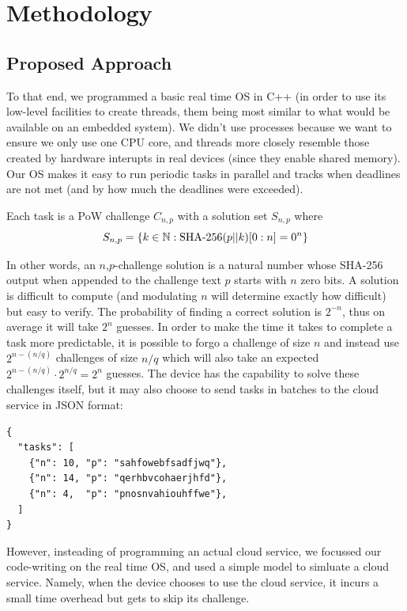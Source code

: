 \documentclass[twoside,twocolumn]{article}
\newcommand{\newp}{\newline\indent}
\begin{document}

\section{Methodology}

\subsection{Proposed Approach}
To that end, we programmed a basic real time OS in C++ (in order to use its low-level facilities to create threads, them being most similar to what would be available on an embedded system).
We didn't use processes because we want to ensure we only use one CPU core, and threads more closely resemble those created by hardware interupts in real devices (since they enable shared memory).
Our OS makes it easy to run periodic tasks in parallel and tracks when deadlines are not met (and by how much the deadlines were exceeded).

Each task is a PoW challenge $C_{n,p}$ with a solution set $S_{n,p}$ where
\[
  S_{n,p} = \{ k \in \mathbb{N} : \textnormal{SHA-256}(p || k)[0:n] = 0^n \}
\]

In other words, an $n$,$p$-challenge solution is a natural number whose SHA-256 output when appended to the challenge text $p$ starts with $n$ zero bits.
A solution is difficult to compute (and modulating $n$ will determine exactly how difficult) but easy to verify.
\newp The probability of finding a correct solution is $2^{-n}$, thus on average it will take $2^n$ guesses.
In order to make the time it takes to complete a task more predictable, it is possible to forgo a challenge of size $n$ and instead use $2^{n-(n/q)}$ challenges of size $n/q$ which will also take an expected $2^{n-(n/q)} \cdot 2^{n/q} = 2^n$ guesses.
\newp The device has the capability to solve these challenges itself, but it may also choose to send tasks in batches to the cloud service in JSON format:

\begin{verbatim}
{
  "tasks": [
    {"n": 10, "p": "sahfowebfsadfjwq"},
    {"n": 14, "p": "qerhbvcohaerjhfd"},
    {"n": 4,  "p": "pnosnvahiouhffwe"},
  ]
}
\end{verbatim}

However, insteading of programming an actual cloud service, we focussed our code-writing on the real time OS, and used a simple model to simluate a cloud service.
Namely, when the device chooses to use the cloud service, it incurs a small time overhead but gets to skip its challenge.
\end{document}
